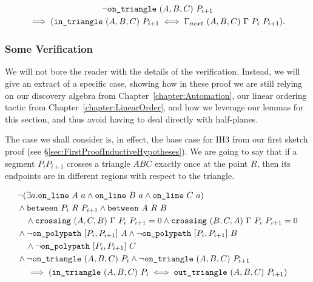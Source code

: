 \begin{multline}
\neg\texttt{on\_triangle}\ (A,B,C)\ P_{i+1}\\
\implies (\texttt{in\_triangle}\ (A,B,C)\ P_{i+1} \iff \Gamma_{next}\ (A,B,C)\ \Gamma\ P_i\ P_{i+1}).
\end{multline}

\subsubsection{Some Verification}
We will not bore the reader with the details of the verification. Instead, we will give an extract of a specific case, showing how in these proof we are still relying on our discovery algebra from Chapter~\ref{chapter:Automation}, our linear ordering tactic from Chapter~\ref{chapter:LinearOrder}, and how we leverage our lemmas for this section, and thus avoid having to deal directly with half-planes.

The case we shall consider is, in effect, the base case for IH3 from our first sketch proof (see \S\ref{sec:FirstProofInductiveHypotheses}). We are going to say that if a segment $P_iP_{i+1}$ crosses a triangle $ABC$ exactly once at the point $R$, then its endpoints are in different regions with respect to the triangle. 

\begin{multline}\label{eq:IH3}
  \begin{aligned}
    &\neg(\exists a.\texttt{on\_line}\ A\ a\wedge \texttt{on\_line}\ B\ a\wedge \texttt{on\_line}\ C\ a)\\
    &\wedge\texttt{between}\ P_i\ R\ P_{i+1} \wedge \texttt{between}\ A\ R\ B \\
    &\quad\wedge\texttt{crossing}\ (A,C,B)\ \Gamma\ P_i\ P_{i+1} = 0\wedge\texttt{crossing}\ (B,C,A)\ \Gamma\ P_i\ P_{i+1} = 0\\
    &\wedge\neg\texttt{on\_polypath}\ [P_i,P_{i+1}]\ A \wedge \neg\texttt{on\_polypath}\ [P_i,P_{i+1}]\ B \\
    &\quad\wedge \neg\texttt{on\_polypath}\ [P_i,P_{i+1}]\ C\\
    &\wedge\neg\texttt{on\_triangle}\ (A,B,C)\ P_i \wedge\neg\texttt{on\_triangle}\ (A,B,C)\ P_{i+1}
  \end{aligned}\\
  \implies\left(\texttt{in\_triangle}\ (A,B,C)\ P_i \iff \texttt{out\_triangle}\ (A,B,C)\ P_{i+1}\right)
\end{multline}

